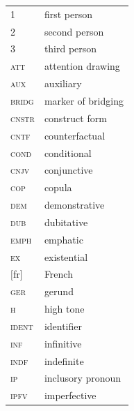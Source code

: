\documentclass[output=paper,colorlinks,citecolor=brown]{langscibook}
\begin{document}
\begin{tabularx}{.58\textwidth}{lQ}
1 & first person \\
2 & second person \\
3 & third person \\
\textsc{att} & attention drawing \\ 
\textsc{aux} & auxiliary \\
\textsc{bridg} & marker of bridging \\
\textsc{cnstr} & construct form \\
\textsc{cntf} & counterfactual \\
\textsc{cond} & conditional \\
\textsc{cnjv} & conjunctive \\
\textsc{cop} & copula \\
\textsc{dem} & demonstrative \\ 
\textsc{dub} & dubitative \\ 
\textsc{emph} & emphatic \\ 
\textsc{ex} & existential \\ 
$[$fr$]$ & French \\
\textsc{ger} & gerund \\ 
\textsc{h} & high tone \\ 
\textsc{ident} & identifier \\ 
\textsc{inf} & infinitive \\ 
\textsc{indf} & indefinite \\ 
\textsc{ip} & inclusory pronoun \\ 
\textsc{ipfv} & imperfective \\ 
\end{tabularx}
\end{document}
